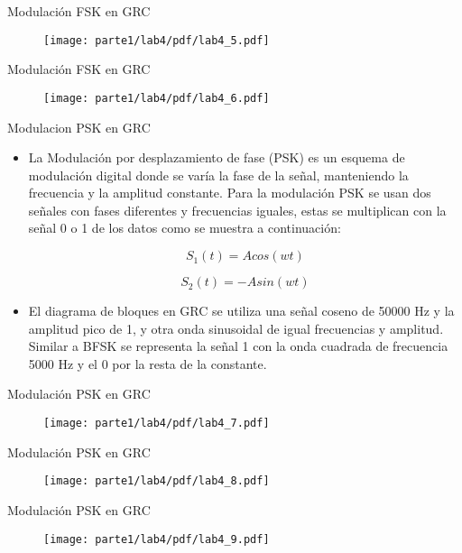 \begin{frame}{Modulación FSK en GRC}
\begin{figure}[H]
\centering
\texttt{[image: parte1/lab4/pdf/lab4\_5.pdf]}
\end{figure}
\end{frame}

\begin{frame}{Modulación FSK en GRC}
\begin{figure}[H]
\centering
\texttt{[image: parte1/lab4/pdf/lab4\_6.pdf]}
\end{figure}
\end{frame}

\begin{frame}{Modulacion PSK en GRC}

  \begin{itemize}
  \item {
La Modulación por desplazamiento de fase (PSK) es un esquema de modulación digital donde se varía la fase de la señal, manteniendo la frecuencia y la amplitud constante. Para la modulación PSK se usan dos señales con fases diferentes y frecuencias iguales, estas se multiplican con la señal 0 o 1 de los datos como se muestra a continuación:

\begin{equation*}
S_{1}(t) = Acos(wt)
\end{equation*}

\begin{equation*}
S_{2}(t) = -Asin(wt)
\end{equation*}

  }
  \item {
El diagrama de bloques en GRC se utiliza una señal coseno de 50000 Hz y la amplitud pico de 1, y otra onda sinusoidal de igual frecuencias y amplitud. Similar a BFSK se representa la señal 1 con la onda cuadrada de frecuencia 5000 Hz y el 0 por la resta de la constante\cite{Conferencia2015}. 
  }
  \end{itemize}
\end{frame}

\begin{frame}{Modulación PSK en GRC}
\begin{figure}[H]
\centering
\texttt{[image: parte1/lab4/pdf/lab4\_7.pdf]}
\end{figure}
\end{frame}

\begin{frame}{Modulación PSK en GRC}
\begin{figure}[H]
\centering
\texttt{[image: parte1/lab4/pdf/lab4\_8.pdf]}
\end{figure}
\end{frame}
\begin{frame}{Modulación PSK en GRC}
\begin{figure}[H]
\centering
\texttt{[image: parte1/lab4/pdf/lab4\_9.pdf]}
\end{figure}
\end{frame}
 

